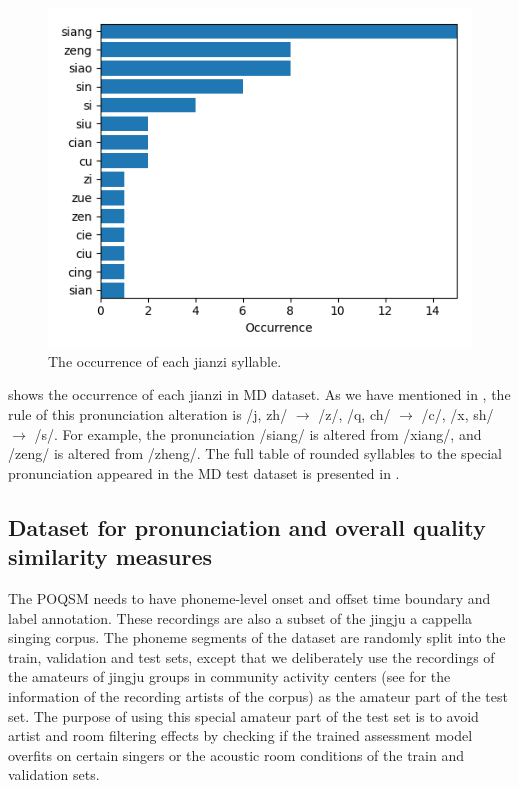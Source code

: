 \begin{figure}[ht!]
\includegraphics[width=\textwidth]{figs/dstats/occurrence_jianzi.png}
\caption{The occurrence of each jianzi syllable.}
\label{fig:ch4:occurrence_jianzi}
\end{figure}

 shows the occurrence of each \gls{jianzi} in \gls{MD} dataset. As we have mentioned in , the rule of this pronunciation alteration is /j, zh/ $\rightarrow$ /z/, /q, ch/ $\rightarrow$ /c/, /x, sh/ $\rightarrow$ /s/. For example, the pronunciation /siang/ is altered from /xiang/, and /zeng/ is altered from /zheng/. The full table of rounded syllables to the special pronunciation appeared in the \gls{MD} test dataset is presented in .

\subsection{Dataset for pronunciation and overall quality similarity measures}\label{sec:ch4:poqsm_dataset}

The \gls{POQSM} needs to have phoneme-level onset and offset time boundary and label annotation. These recordings are also a subset of the jingju a cappella singing corpus. The phoneme segments of the dataset are randomly split into the train, validation and test sets, except that we deliberately use the recordings of the amateurs of jingju groups in community activity centers (see  for the information of the recording artists of the corpus) as the amateur part of the test set. The purpose of using this special amateur part of the test set is to avoid artist and room filtering effects by checking if the trained assessment model overfits on certain singers or the acoustic room conditions of the train and validation sets.

